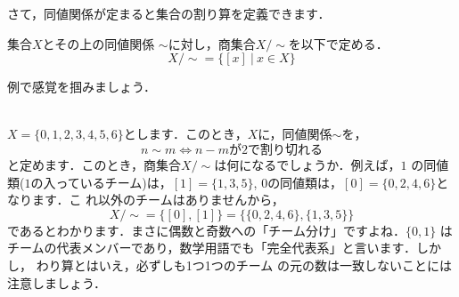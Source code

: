 
さて，同値関係が定まると集合の割り算を定義できます．

\begin{defi}[商集合]
 集合$X$とその上の同値関係
 $\sim$に対し，商集合$X/\sim$を以下で定める．
 \[
  X/\sim=\{[x]\ |\ x\in X\}
 \]
\end{defi}

例で感覚を掴みましょう．

 \begin{Ex}{\ } \\
  $X=\{0,1,2,3,4,5,6\}$とします．このとき，$X$に，同値関係$\sim$を，
 \[
  n\sim m\Leftrightarrow n-mが2で割り切れる
 \]
  と定めます．このとき，商集合$X/\sim$は何になるでしょうか．例えば，$1$
  の同値類($1$の入っているチーム)は，$[1]=\{1,3,5\}$, $0$の同値類は，$[0]=\{0,2,4,6\}$となります．こ
  れ以外のチームはありませんから，
  \[
   X/\sim=\{[0],[1]\}=\{\{0,2,4,6\},\{1,3,5\}\}
  \]
であるとわかります．まさに偶数と奇数への「チーム分け」ですよね．$\{0,1\}$
  はチームの代表メンバーであり，数学用語でも「完全代表系」と言います．しかし，
  わり算とはいえ，必ずしも1つ1つのチーム
  の元の数は一致しないことには注意しましょう．
 \end{Ex}

